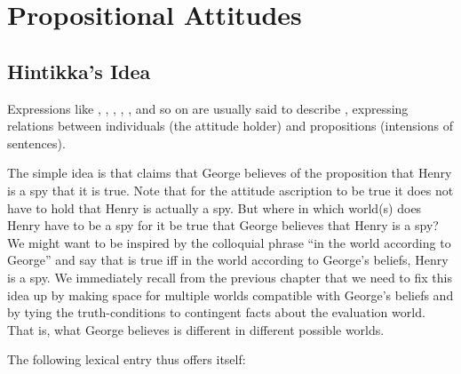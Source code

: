 \chapter{Propositional Attitudes}\label{cha:propositional_attitudes} %


\minitoc

\section{Hintikka's Idea} \label{sec:hintikkas-idea}

Expressions %
%
like , , ,
, , and so on are usually said
to describe , expressing relations
between individuals (the attitude holder) and propositions (intensions
of sentences).

The simple idea is that  claims that George believes of the proposition that Henry is a
spy that it is true. %
%
Note that for the attitude ascription to be true it does not have to
hold that Henry is actually a spy. But where \dash in which world(s)
\dash does Henry have to be a spy for it be true that George believes
that Henry is a spy? We might want to be inspired by the colloquial
phrase ``in the world according to George'' and say that
 is true iff in the
world according to George's beliefs, Henry is a spy. We immediately
recall from the previous chapter that we need to fix this idea up by
making space for multiple worlds compatible with George's beliefs and
by tying the truth-conditions to contingent facts about the evaluation
world. That is, what George believes is different in different
possible worlds.

\clearpage The following lexical entry thus offers itself:

